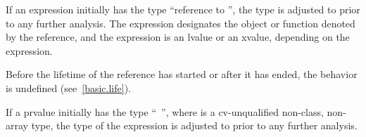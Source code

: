 \pnum
{}%
If an expression initially has the type ``reference to
'', the type is adjusted to
 prior to any further analysis. The expression designates the
object or function denoted by the reference, and the expression
is an lvalue or an xvalue, depending on the expression.
\begin{note}
Before the lifetime of the reference has started or after it has ended,
the behavior is undefined (see~\ref{basic.life}).
\end{note}

\pnum
If a prvalue initially has the type ``\cv{}~'', where
 is a cv-unqualified non-class, non-array type, the type of
the expression is adjusted to  prior to any further analysis.

